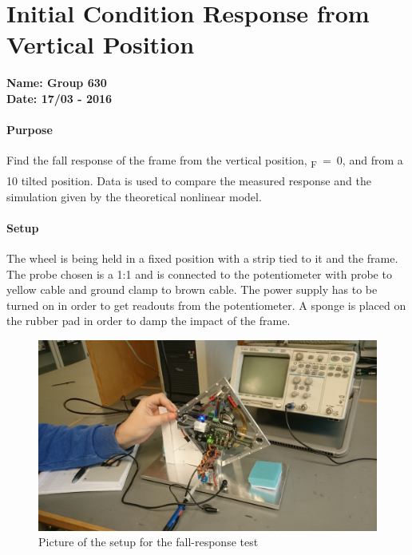 \chapter{Initial Condition Response from Vertical Position}\label{fallResponseAppendix} 
\textbf{Name: Group 630}\\
\textbf{Date: 17/03 - 2016}

\subsubsection{Purpose}
Find the fall response of the frame from the vertical position, \si{\theta_F=0}, and from a \si{10^\circ} tilted position.
Data is used to compare the measured response and the simulation given by the theoretical nonlinear model.

\subsubsection{Setup}
The wheel is being held in a fixed position with a strip tied to it and the frame. The probe chosen is a 1:1 and is connected to the potentiometer with probe to yellow cable and ground clamp to brown cable. The power supply has to be turned on in order to get readouts from the potentiometer. A sponge is placed on the rubber pad in order to damp the impact of the frame.
\begin{figure}[H]                                   
	\centering                                        
	\includegraphics[scale=0.08]{figures/stepResponseSetup}
	\caption{Picture of the setup for the fall-response test}
	\label{stepResponseTestPicture} 
\end{figure}              


